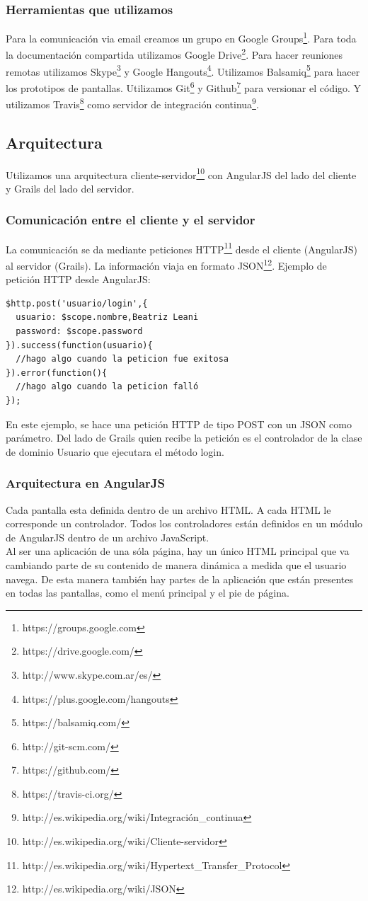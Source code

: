 \subsubsection{Herramientas que utilizamos}
Para la comunicación via email creamos un grupo en Google Groups\footnote{https://groups.google.com}.
Para toda la documentación compartida utilizamos Google Drive\footnote{https://drive.google.com/}. Para hacer reuniones remotas utilizamos Skype\footnote{http://www.skype.com.ar/es/} y Google Hangouts\footnote{https://plus.google.com/hangouts}. Utilizamos Balsamiq\footnote{https://balsamiq.com/} para hacer los prototipos de pantallas. Utilizamos Git\footnote{http://git-scm.com/} y Github\footnote{https://github.com/} para versionar el código. Y utilizamos Travis\footnote{https://travis-ci.org/} como servidor de integración continua\footnote{http://es.wikipedia.org/wiki/Integración\_continua}.
\subsection{Arquitectura}
Utilizamos una arquitectura cliente-servidor\footnote{http://es.wikipedia.org/wiki/Cliente-servidor} con AngularJS del lado del cliente y Grails del lado del servidor. 
\subsubsection{Comunicación entre el cliente y el servidor}
La comunicación se da mediante peticiones HTTP\footnote{http://es.wikipedia.org/wiki/Hypertext\_Transfer\_Protocol} desde el cliente (AngularJS) al servidor (Grails). La información viaja en formato JSON\footnote{http://es.wikipedia.org/wiki/JSON}. Ejemplo de petición HTTP desde AngularJS:\\
\begin{verbatim}
$http.post('usuario/login',{
  usuario: $scope.nombre,Beatriz Leani
  password: $scope.password
}).success(function(usuario){
  //hago algo cuando la peticion fue exitosa
}).error(function(){
  //hago algo cuando la peticion falló
});		
\end{verbatim}
En este ejemplo, se hace una petición HTTP de tipo POST con un JSON como parámetro. Del lado de Grails quien recibe la petición es el controlador de la clase de dominio Usuario que ejecutara el método login.
\subsubsection{Arquitectura en AngularJS}
Cada pantalla esta definida dentro de un archivo HTML. A cada HTML le corresponde un controlador. Todos los controladores están definidos en un módulo de AngularJS dentro de un archivo JavaScript.\\
Al ser una aplicación de una sóla página, hay un único HTML principal que va cambiando parte de su contenido de manera dinámica a medida que el usuario navega. De esta manera también hay partes de la aplicación que están presentes en todas las pantallas, como el menú principal y el pie de página.
